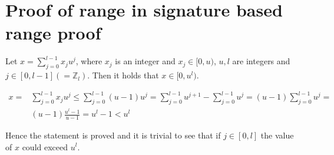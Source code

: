 \chapter{Proof of range in signature based range proof}
\label{appendix:range}

Let $x=\sum_{j=0}^{l-1} x_j u^j$, where $x_j$ is an integer and $x_j\in[0,u)$, $u,l$ are integers and $j\in[0,l-1] (=\mathds{Z}_l)$. Then it holds that $x\in[0,u^l)$.

\begin{align*}
x =& \sum_{j=0}^{l-1} x_j u^j \leq \sum_{j=0}^{l-1}  (u-1)u^j = \sum_{j=0}^{l-1} u^{j+1} - \sum_{j=0}^{l-1} u^j = (u-1) \sum_{j=0}^{l-1} u^j =\\
 &(u-1) \frac{u^l-1}{u-1} = u^l-1< u^l 
\end{align*}

Hence the  statement is proved and it is trivial to see that if $j\in[0,l]$ the value of $x$ could exceed $u^l$.
